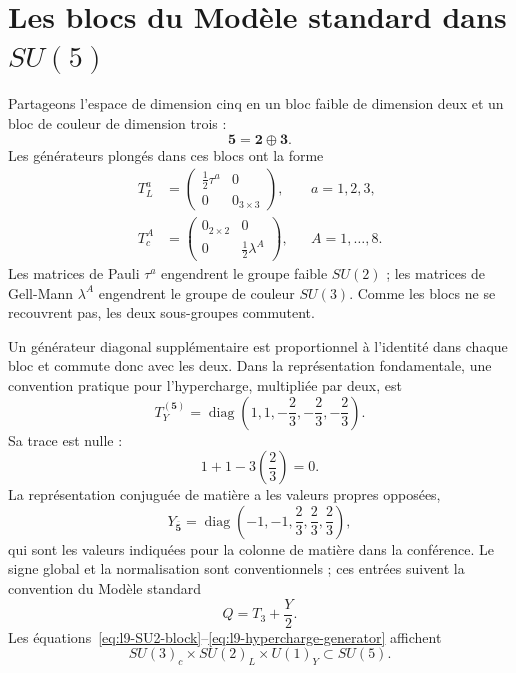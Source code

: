 \section{Les blocs du Modèle standard dans \texorpdfstring{\(SU(5)\)}{SU(5)}}

Partageons l’espace de dimension cinq en un bloc faible de dimension deux et un bloc de couleur de dimension trois :
\begin{equation}
\mathbf5=\mathbf2\oplus\mathbf3.
\end{equation}
Les générateurs plongés dans ces blocs ont la forme
\begin{align}
T^a_L
&=
\begin{pmatrix}
\tfrac12\tau^a&0\\
0&0_{3\times3}
\end{pmatrix},
&& a=1,2,3,
\label{eq:l9-SU2-block}\\
T^A_c
&=
\begin{pmatrix}
0_{2\times2}&0\\
0&\tfrac12\lambda^A
\end{pmatrix},
&& A=1,\ldots,8.
\label{eq:l9-SU3-block}
\end{align}
Les matrices de Pauli \(\tau^a\) engendrent le groupe faible \(SU(2)\) ; les matrices de Gell-Mann \(\lambda^A\) engendrent le groupe de couleur \(SU(3)\). Comme les blocs ne se recouvrent pas, les deux sous-groupes commutent.

Un générateur diagonal supplémentaire est proportionnel à l’identité dans chaque bloc et commute donc avec les deux. Dans la représentation fondamentale, une convention pratique pour l’hypercharge, multipliée par deux, est
\begin{equation}
T_Y^{(\mathbf5)}=
\operatorname{diag}
\left(
1,1,-\frac23,-\frac23,-\frac23
\right).
\label{eq:l9-hypercharge-generator}
\end{equation}
Sa trace est nulle :
\begin{equation}
1+1-3\left(\frac23\right)=0.
\end{equation}
La représentation conjuguée de matière a les valeurs propres opposées,
\begin{equation}
Y_{\overline{\mathbf5}}
=
\operatorname{diag}
\left(
-1,-1,\frac23,\frac23,\frac23
\right),
\label{eq:l9-fivebar-hypercharge}
\end{equation}
qui sont les valeurs indiquées pour la colonne de matière dans la conférence. Le signe global et la normalisation sont conventionnels ; ces entrées suivent la convention du Modèle standard
\begin{equation}
Q=T_3+\frac{Y}{2}.
\label{eq:l9-charge}
\end{equation}
Les équations~\eqref{eq:l9-SU2-block}--\eqref{eq:l9-hypercharge-generator} affichent
\begin{equation}
SU(3)_c\times SU(2)_L\times U(1)_Y
\subset SU(5).
\end{equation}

